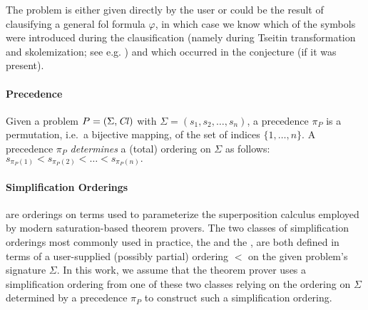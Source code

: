 The problem is either given directly by the user or 
could be the result of clausifying a general \gls{fol} formula \(\varphi\),
in which case we know which of the symbols were introduced during the clausification
(namely during Tseitin transformation and skolemization; see e.g. \citet{DBLP:books/el/RV01/NonnengartW01})
and which occurred in the conjecture (if it was present).

\paragraph{Precedence}
Given a problem \(P = (\Sigma, \operatorname{\mathit{Cl}})\) with \(\Sigma = (s_1, s_2, \ldots, s_n)\),
a precedence \(\pi_P\) is a permutation, i.e.~a bijective mapping, of the set of indices \(\{1,\ldots,n\}\).
A precedence \(\pi_P\) \emph{determines} a (total) ordering on \(\Sigma\) as follows:
\(s_{\pi_P(1)} < s_{\pi_P(2)} < \ldots < s_{\pi_P(n)}.\)

\paragraph{Simplification Orderings} are orderings on terms used to parameterize the superposition calculus \cite{Nieuwenhuis2001}
employed by modern saturation-based theorem provers. The two classes of simplification orderings most commonly used in practice,
the  \cite{Knuth1983} and the  \cite{Kamin1980}, are both defined in terms 
of a user-supplied (possibly partial) ordering $<$ %
on the given problem's signature \(\Sigma\).
In this work, we assume that the theorem prover uses a simplification ordering from one of these two classes
relying on the ordering on \(\Sigma\) determined by a precedence \(\pi_P\) to construct such a simplification ordering.

